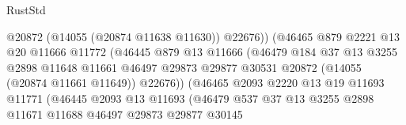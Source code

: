 \begin{lexlean}{RustStd}
\begin{coremodule}
                                          @20872
                                          (@14055 (@20874 @11638 @11630))
                                          @22676))
                                      (@46465
                                        @879
                                        @2221
                                        @13
                                        @20
                                        @11666
                                        @11772
                                        (@46445
                                          @879
                                          @13
                                          @11666
                                          (@46479
                                            @184
                                            @37
                                            @13
                                            @3255
                                            @2898
                                            @11648
                                            @11661
                                            @46497
                                            @29873
                                            @29877
                                            @30531
                                            @20872
                                            (@14055 (@20874 @11661 @11649))
                                            @22676))
                                        (@46465
                                          @2093
                                          @2220
                                          @13
                                          @19
                                          @11693
                                          @11771
                                          (@46445
                                            @2093
                                            @13
                                            @11693
                                            (@46479
                                              @537
                                              @37
                                              @13
                                              @3255
                                              @2898
                                              @11671
                                              @11688
                                              @46497
                                              @29873
                                              @29877
                                              @30145

\end{coremodule}
\end{lexlean}
